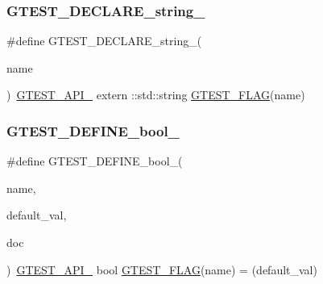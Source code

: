 \subsubsection{\texorpdfstring{G\+T\+E\+S\+T\+\_\+\+D\+E\+C\+L\+A\+R\+E\+\_\+string\+\_\+}{GTEST\_DECLARE\_string\_}}
{\footnotesize\ttfamily \#define G\+T\+E\+S\+T\+\_\+\+D\+E\+C\+L\+A\+R\+E\+\_\+string\+\_\+(\begin{DoxyParamCaption}\item[{}]{name }\end{DoxyParamCaption})~\hyperlink{gtest-port_8h_aa73be6f0ba4a7456180a94904ce17790}{G\+T\+E\+S\+T\+\_\+\+A\+P\+I\+\_\+} extern \+::std\+::string \hyperlink{gtest-port_8h_a828f4e34a1c4b510da50ec1563e3562a}{G\+T\+E\+S\+T\+\_\+\+F\+L\+AG}(name)}

\mbox{\label{gtest-port_8h_a48e05814779e5a2f432b06a12618a760}} 
\subsubsection{\texorpdfstring{G\+T\+E\+S\+T\+\_\+\+D\+E\+F\+I\+N\+E\+\_\+bool\+\_\+}{GTEST\_DEFINE\_bool\_}}
{\footnotesize\ttfamily \#define G\+T\+E\+S\+T\+\_\+\+D\+E\+F\+I\+N\+E\+\_\+bool\+\_\+(\begin{DoxyParamCaption}\item[{}]{name,  }\item[{}]{default\+\_\+val,  }\item[{}]{doc }\end{DoxyParamCaption})~\hyperlink{gtest-port_8h_aa73be6f0ba4a7456180a94904ce17790}{G\+T\+E\+S\+T\+\_\+\+A\+P\+I\+\_\+} bool \hyperlink{gtest-port_8h_a828f4e34a1c4b510da50ec1563e3562a}{G\+T\+E\+S\+T\+\_\+\+F\+L\+AG}(name) = (default\+\_\+val)}

\mbox{\label{gtest-port_8h_a88ee2f19589ffff86ca742fd33611358}} 
